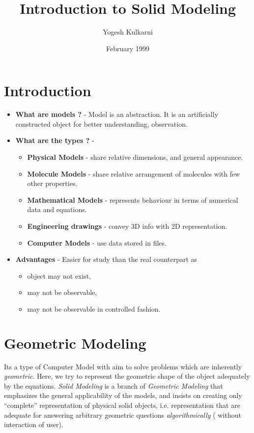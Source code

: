 \documentclass[12pt,a4paper,openbib]{article}
\title{ Introduction to Solid Modeling}
\author{Yogesh Kulkarni}
\date{February 1999}
\begin{document}
\maketitle
\section{Introduction}
\begin{itemize}
	\item 	{\bf What are models ?} - Model is an abstraction. It 
		is an artificially constructed object for better understanding,
		observation.
	\item	{\bf What are the types ?} -
		\begin{itemize}
			\item {\bf Physical Models} - share relative dimensions,
				and general appearance.
			\item {\bf Molecule Models} - share relative arrangement
				of molecules with few other properties.
			\item {\bf Mathematical Models} - represents behaviour
				in terms of numerical data and equations.
			\item {\bf Engineering drawings} - convey 3D info with
				2D representation.
			\item {\bf Computer Models} - use data stored in files.
		\end{itemize}
	\item {\bf Advantages} - Easier for study than the real counterpart as
		\begin{itemize}
			\item object may not exist, 
			\item may not be observable, 
			\item may not be observable in controlled fashion.
		\end{itemize}
\end{itemize}


\section{Geometric Modeling}
Its a type of Computer Model with aim to solve problems which are inherently
{\it geometric}. Here, we try to represent the geometric shape of the object 
adequately by the equations. {\em Solid Modeling} is a branch of {\em Geometric
Modeling} that emphasizes the general applicability of the models, and insists
on creating only ``complete'' representation of physical solid objects, i.e.
representation that are adequate for answering arbitrary geometric questions
{\it algorithmically} ( without interaction of user).
\end{document}
